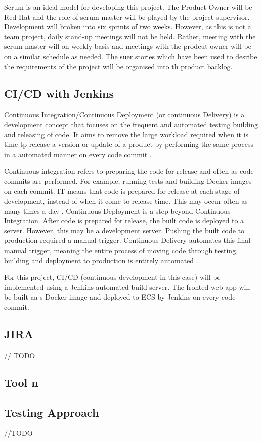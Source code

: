 	Scrum is an ideal model for developing this project. The Product Owner will be Red Hat and the role of scrum master will be played by the project supervisor. Development will broken into six sprints of two weeks. However, as this is not a team project, daily stand-up meetings will not be held. Rather, meeting with the scrum master will on weekly basis and meetings with the prodcut owner will be on a similar schedule as needed. The suer stories which have been used to desribe the requirements of the project will be organised into th product backlog.
	
	\subsection{CI/CD with Jenkins}
	Continuous Integration/Continuous Deployment (or continuous Delivery) is a development concept that focuses on the frequent and automated testing building and releasing of code. It aims to remove the large workload required when it is time tp release a version or update of a product by performing the same process in a automated manner on every code commit \citep{pittet}.
	
	Continuous integration refers to preparing the code for release and often as code commits are performed. For example, running tests and building Docker images on each commit. IT means that code is prepared for release at each stage of development, instead of when it come to release time. This may occur often as many times a day \citep{ramos}.
	Continuous Deployment is a step beyond Continuous Integration. After code is prepared for release, the built code is deployed to a server. However, this may be a development server. Pushing the built code to production required a manual trigger. Continuous Delivery automates this final manual trigger, meaning the entire process of moving code through testing, building and deployment to production is entirely automated \citep{ellingwood}.
	
	For this project, CI/CD (continuous development in this case) will be implemented using a Jenkins automated build server. The fronted web app will be built aa s Docker image and deployed to ECS by Jenkins on every code commit.
	
	\subsection{JIRA}
	// TODO
	\subsection{Tool n}
	\subsection{Testing Approach}
	//TODO